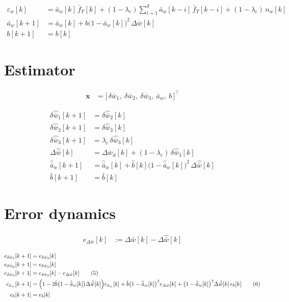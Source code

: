 \documentclass[11pt,a4paper,fontset=none]{ctexart}
\newcommand{\ba}{\bar{a}}
\newcommand{\bw}{\bar{w}}
\newcommand{\dW}{\Delta\bw}
\newcommand{\dWh}{\Delta\hat{\bw}}
\newcommand{\eD}{e_{\Delta\bw}}
\newcommand{\ah}{\hat{\ba}_w}
\newcommand{\bh}{\hat{b}}
\newcommand{\ea}{e_{\ba_w}}
\begin{document}
\begin{align*}
\varepsilon_w[k] &= \ba_w[k]\,\bar f_T[k] + (1-\lambda_c)\sum_{i=1}^{d}\ba_w[k-i]\,\bar f_T[k-i] + (1-\lambda_c)\,n_w[k] \\
\ba_w[k+1]       &= \ba_w[k] + b\bigl(1-\ba_w[k]\bigr)^{2}\,\dW[k] \\
b[k+1]           &= b[k]
\end{align*}

\section{Estimator}

\begin{align*}
\mathbf{x} &= \bigl[\,\delta\bw_1,\ \delta\bw_2,\ \delta\bw_3,\ \ba_w,\ b\,\bigr]^{\top}
\end{align*}

\begin{align*}
\delta\hat{\bw}_1[k+1] &= \delta\hat{\bw}_2[k] \\
\delta\hat{\bw}_2[k+1] &= \delta\hat{\bw}_3[k] \\
\delta\hat{\bw}_3[k+1] &= \lambda_c\,\delta\hat{\bw}_3[k] \\
\dWh[k]                &= \Delta\bw_d[k] + (1-\lambda_c)\,\delta\hat{\bw}_3[k] \\
\ah[k+1]               &= \ah[k] + \bh[k]\bigl(1-\ah[k]\bigr)^{2}\,\dWh[k] \\
\bh[k+1]               &= \bh[k]
\end{align*}

\section{Error dynamics}

\begin{align*}
\eD[k] &:= \dW[k] - \dWh[k]
\end{align*}

\begin{align*}
e_{\delta\bw_1}[k+1] &= e_{\delta\bw_2}[k] \\
e_{\delta\bw_2}[k+1] &= e_{\delta\bw_3}[k] \\
e_{\delta\bw_3}[k+1] &= e_{\delta\bw_3}[k] - \eD[k] \tag{5} \\
\ea[k+1]             &= \Bigl(1 - 2\bh\bigl(1-\ah[k]\bigr)\dWh[k]\Bigr)\ea[k] + \bh\bigl(1-\ah[k]\bigr)^{2}\eD[k]
                        + \bigl(1-\ah[k]\bigr)^{2}\dWh[k]\,e_b[k] \tag{6} \\
e_b[k+1]             &= e_b[k]
\end{align*}
\end{document}
